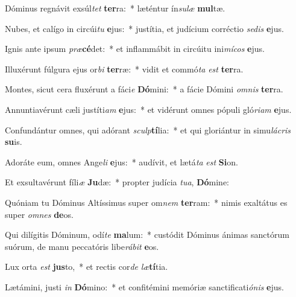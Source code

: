 \item Dóminus regnávit exsúl\textit{tet} \textbf{ter}ra:~* læténtur ín\textit{su}\textit{læ} \textbf{mul}tæ.
\item Nubes, et calígo in circúi\textit{tu} \textbf{e}jus:~* justítia, et judícium corréctio \textit{se}\textit{dis} \textbf{e}jus.
\item Ignis ante ipsum \textit{præ}\textbf{cé}det:~* et inflammábit in circúitu ini\textit{mí}\textit{cos} \textbf{e}jus.
\item Illuxérunt fúlgura ejus or\textit{bi} \textbf{ter}ræ:~* vidit et commó\textit{ta} \textit{est} \textbf{ter}ra.
\item Montes, sicut cera fluxérunt a fáci\textit{e} \textbf{Dó}mini:~* a fácie Dómini \textit{om}\textit{nis} \textbf{ter}ra.
\item Annuntiavérunt cæli justíti\textit{am} \textbf{e}jus:~* et vidérunt omnes pópuli gló\textit{ri}\textit{am} \textbf{e}jus.
\item Confundántur omnes, qui adórant \textit{sculp}\textbf{tí}lia:~* et qui gloriántur in simu\textit{lá}\textit{cris} \textbf{su}is.
\item Adoráte eum, omnes Ange\textit{li} \textbf{e}jus:~* audívit, et lætá\textit{ta} \textit{est} \textbf{Si}on.
\item Et exsultavérunt fíli\textit{æ} \textbf{Ju}dæ:~* propter judícia \textit{tu}\textit{a}, \textbf{Dó}mine:
\item Quóniam tu Dóminus Altíssimus super om\textit{nem} \textbf{ter}ram:~* nimis exaltátus es super \textit{om}\textit{nes} \textbf{de}os.
\item Qui dilígitis Dóminum, odí\textit{te} \textbf{ma}lum:~* custódit Dóminus ánimas sanctórum suórum, de manu peccatóris libe\textit{rá}\textit{bit} \textbf{e}os.
\item Lux orta \textit{est} \textbf{jus}to,~* et rectis cor\textit{de} \textit{læ}\textbf{tí}tia.
\item Lætámini, justi \textit{in} \textbf{Dó}mino:~* et confitémini memóriæ sanctificati\textit{ó}\textit{nis} \textbf{e}jus.
